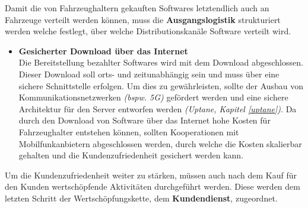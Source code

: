 Damit die von Fahrzeughaltern gekauften Softwares letztendlich auch an Fahrzeuge verteilt werden können, muss die \textbf{Ausgangslogistik} strukturiert werden welche festlegt, über welche Distributionskanäle Software verteilt wird.
\begin{itemize}
	\item[] \hspace{-0.6cm} \textbf{Gesicherter Download über das Internet}\\
	Die Bereitstellung bezahlter Softwares wird mit dem Download abgeschlossen. Dieser Download soll orts- und zeitunabhängig sein und muss über eine sichere Schnittstelle erfolgen. Um dies zu gewährleisten, sollte der Ausbau von Kommunikationsnetzwerken \textit{(bspw. 5G)} gefördert werden und eine sichere Architektur für den Server entworfen werden \textit{(Uptane, Kapitel \ref{uptane})}. Da durch den Download von Software über das Internet hohe Kosten für Fahrzeughalter entstehen können, sollten Kooperationen mit Mobilfunkanbietern abgeschlossen werden, durch welche die Kosten skalierbar gehalten und die Kundenzufriedenheit gesichert werden kann.
\end{itemize}
Um die Kundenzufriedenheit weiter zu stärken, müssen auch nach dem Kauf für den Kunden wertschöpfende Aktivitäten durchgeführt werden. Diese werden dem letzten Schritt der Wertschöpfungskette, dem \textbf{Kundendienst}, zugeordnet.	
